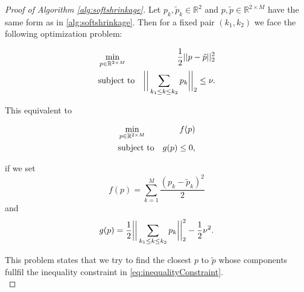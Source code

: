     \begin{proof}[Proof of Algorithm \ref{alg:softshrinkage}]
        Let $p_{k}, \tilde{p}_{k} \in \mathbb{R}^{2}$ and $p, \tilde{p} \in \mathbb{R}^{2 \times M}$ have the same form as in \ref{alg:softshrinkage}. Then for a fixed pair $(k_{1}, k_{2})$ we face the following optimization problem: %

        \begin{eqnarray}
            &\min\limits_{p \in \mathbb{R}^{2 \times M}}& \frac{1}{2} ||p - \tilde{p}||^{2}_{2} \notag \\
            &\textnormal{subject to}& \bigg{|} \bigg{|} \sum_{k_{1} \le k \le k_{2}} p_{k} \bigg{|} \bigg{|}_{2} \le \nu. \notag
        \end{eqnarray}

        This equivalent to

        \begin{eqnarray}
            &\min\limits_{p \in \mathbb{R}^{2 \times M}}& f(p) \notag \\
            &\textnormal{subject to}& g(p) \le 0, \label{eq:inequalityConstraint}
        \end{eqnarray}

        if we set
            $$f(p) = \sum_{k = 1}^{M} \frac{(p_{k} - \tilde{p}_{k})^{2}}{2}$$
        and
            $$g(p) = \frac{1}{2} \bigg{|} \bigg{|} \sum_{k_{1} \le k \le k_{2}} p_{k} \bigg{|} \bigg{|}_{2}^{2} - \frac{1}{2} \nu^{2}.$$

        This problem states that we try to find the closest $p$ to $\tilde{p}$ whose components fullfil the inequality constraint in \ref{eq:inequalityConstraint}.\\



\end{proof}

